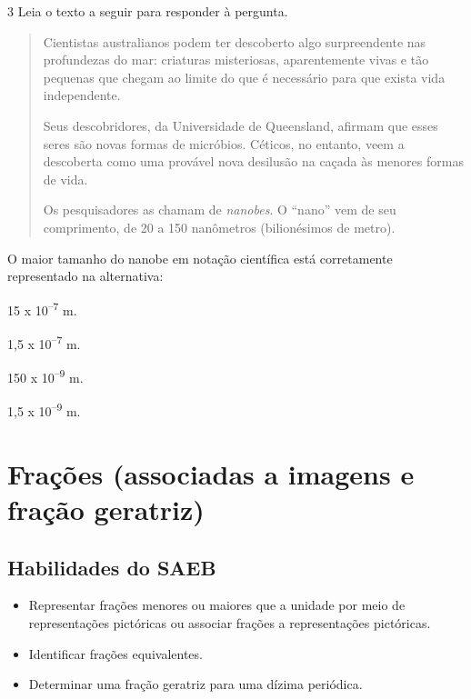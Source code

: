 \begin{escolha}
\num{3} Leia o texto a seguir para responder à pergunta.

\begin{quote}
Cientistas australianos podem ter descoberto algo surpreendente nas
profundezas do mar: criaturas misteriosas, aparentemente vivas e tão
pequenas que chegam ao limite do que é necessário para que exista vida
independente.

Seus descobridores, da Universidade de Queensland, afirmam que esses
seres são novas formas de micróbios. Céticos, no entanto, veem a
descoberta como uma provável nova desilusão na caçada às menores formas
de vida.

Os pesquisadores as chamam de \textit{nanobes}. O ``nano'' vem de seu 
comprimento, de 20 a 150 nanômetros (bilionésimos de metro).

\end{quote}

O maior tamanho do nanobe em notação científica está corretamente
representado na alternativa:

\begin{escolha}
\item 15 x 10\textsuperscript{--7} m.
\item 1,5 x 10\textsuperscript{--7} m.
\item 150 x 10\textsuperscript{--9} m.
\item 1,5 x 10\textsuperscript{--9} m.
\end{escolha}

\chapter{Frações (associadas a imagens e fração geratriz)}

\section{Habilidades do SAEB}

\begin{itemize}

  \item Representar frações menores ou maiores que a unidade por meio de
representações pictóricas ou associar frações a representações pictóricas.
  \item Identificar frações equivalentes.
  \item Determinar uma fração geratriz para uma dízima periódica.   


\end{itemize}
\end{escolha}
